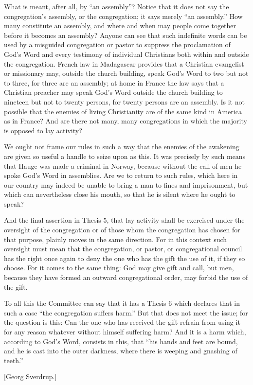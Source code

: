 What is meant, after all, by “an assembly”? Notice that it does not say the congregation’s assembly, or the congregation; it says merely “an assembly.” How many constitute an assembly, and where and when may people come together before it becomes an assembly? Anyone can see that such indefinite words can be used by a misguided congregation or pastor to suppress the proclamation of God’s Word and every testimony of individual Christians both within and outside the congregation. French law in Madagascar provides that a Christian evangelist or missionary may, outside the church building, speak God’s Word to two but not to three, for three are an assembly; at home in France the law says that a Christian preacher may speak God’s Word outside the church building to nineteen but not to twenty persons, for twenty persons are an assembly. Is it not possible that the enemies of living Christianity are of the same kind in America as in France? And are there not many, many congregations in which the majority is opposed to lay activity?

We ought not frame our rules in such a way that the enemies of the awakening are given so useful a handle to seize upon as this. It was precisely by such means that Hauge was made a criminal in Norway, because without the call of men he spoke God’s Word in assemblies. Are we to return to such rules, which here in our country may indeed be unable to bring a man to fines and imprisonment, but which can nevertheless close his mouth, so that he is silent where he ought to speak?

And the final assertion in Thesis 5, that lay activity shall be exercised under the oversight of the congregation or of those whom the congregation has chosen for that purpose, plainly moves in the same direction. For in this context such oversight must mean that the congregation, or pastor, or congregational council has the right once again to deny the one who has the gift the use of it, if they so choose. For it comes to the same thing: God may give gift and call, but men, because they have formed an outward congregational order, may forbid the use of the gift.

To all this the Committee can say that it has a Thesis 6 which declares that in such a case “the congregation suffers harm.” But that does not meet the issue; for the question is this: Can the one who has received the gift refrain from using it for any reason whatever without himself suffering harm? And it is a harm which, according to God’s Word, consists in this, that “his hands and feet are bound, and he is cast into the outer darkness, where there is weeping and gnashing of teeth.”

[Georg Sverdrup.]

